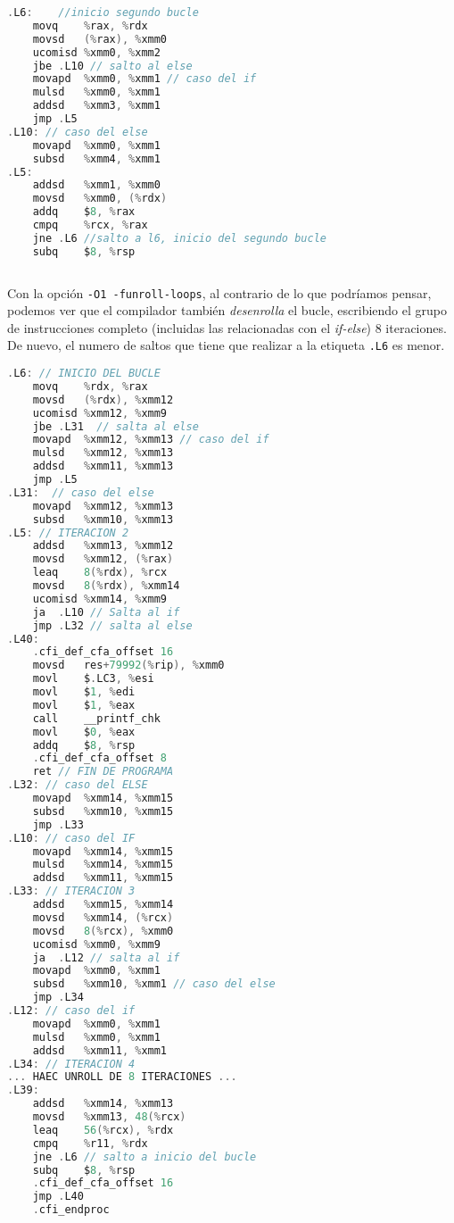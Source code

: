 \documentclass[10pt,a4paper]{article}
\begin{document}
\begin{lstlisting}[language=C]
.L6:	//inicio segundo bucle
	movq	%rax, %rdx
	movsd	(%rax), %xmm0
	ucomisd	%xmm0, %xmm2
	jbe	.L10 // salto al else
	movapd	%xmm0, %xmm1 // caso del if
	mulsd	%xmm0, %xmm1
	addsd	%xmm3, %xmm1
	jmp	.L5
.L10: // caso del else
	movapd	%xmm0, %xmm1
	subsd	%xmm4, %xmm1
.L5: 
	addsd	%xmm1, %xmm0
	movsd	%xmm0, (%rdx)
	addq	$8, %rax
	cmpq	%rcx, %rax
	jne	.L6 //salto a l6, inicio del segundo bucle
	subq	$8, %rsp
	
\end{lstlisting}


Con la opción \texttt{-O1 -funroll-loops}, al contrario de lo que podríamos pensar, podemos ver que el compilador también \textit{desenrolla} el bucle, escribiendo el  grupo de instrucciones completo (incluidas las relacionadas con el \textit{if-else}) 8 iteraciones. De nuevo, el numero de saltos que tiene que realizar a la etiqueta \texttt{.L6} es menor.

\begin{lstlisting}[language=C]
.L6: // INICIO DEL BUCLE
	movq	%rdx, %rax
	movsd	(%rdx), %xmm12
	ucomisd	%xmm12, %xmm9
	jbe	.L31  // salta al else
	movapd	%xmm12, %xmm13 // caso del if
	mulsd	%xmm12, %xmm13
	addsd	%xmm11, %xmm13
	jmp	.L5 
.L31:  // caso del else
	movapd	%xmm12, %xmm13
	subsd	%xmm10, %xmm13
.L5: // ITERACION 2
	addsd	%xmm13, %xmm12
	movsd	%xmm12, (%rax)
	leaq	8(%rdx), %rcx
	movsd	8(%rdx), %xmm14
	ucomisd	%xmm14, %xmm9
	ja	.L10 // Salta al if 
	jmp	.L32 // salta al else
.L40:
	.cfi_def_cfa_offset 16
	movsd	res+79992(%rip), %xmm0
	movl	$.LC3, %esi
	movl	$1, %edi
	movl	$1, %eax
	call	__printf_chk
	movl	$0, %eax
	addq	$8, %rsp
	.cfi_def_cfa_offset 8
	ret // FIN DE PROGRAMA
.L32: // caso del ELSE
	movapd	%xmm14, %xmm15
	subsd	%xmm10, %xmm15
	jmp	.L33
.L10: // caso del IF 
	movapd	%xmm14, %xmm15
	mulsd	%xmm14, %xmm15
	addsd	%xmm11, %xmm15
.L33: // ITERACION 3
	addsd	%xmm15, %xmm14
	movsd	%xmm14, (%rcx)
	movsd	8(%rcx), %xmm0
	ucomisd	%xmm0, %xmm9
	ja	.L12 // salta al if
	movapd	%xmm0, %xmm1
	subsd	%xmm10, %xmm1 // caso del else
	jmp	.L34
.L12: // caso del if
	movapd	%xmm0, %xmm1
	mulsd	%xmm0, %xmm1
	addsd	%xmm11, %xmm1
.L34: // ITERACION 4
... HAEC UNROLL DE 8 ITERACIONES ...
.L39:
	addsd	%xmm14, %xmm13
	movsd	%xmm13, 48(%rcx)
	leaq	56(%rcx), %rdx
	cmpq	%r11, %rdx
	jne	.L6 // salto a inicio del bucle
	subq	$8, %rsp
	.cfi_def_cfa_offset 16
	jmp	.L40
	.cfi_endproc

\end{lstlisting}
\end{document}
